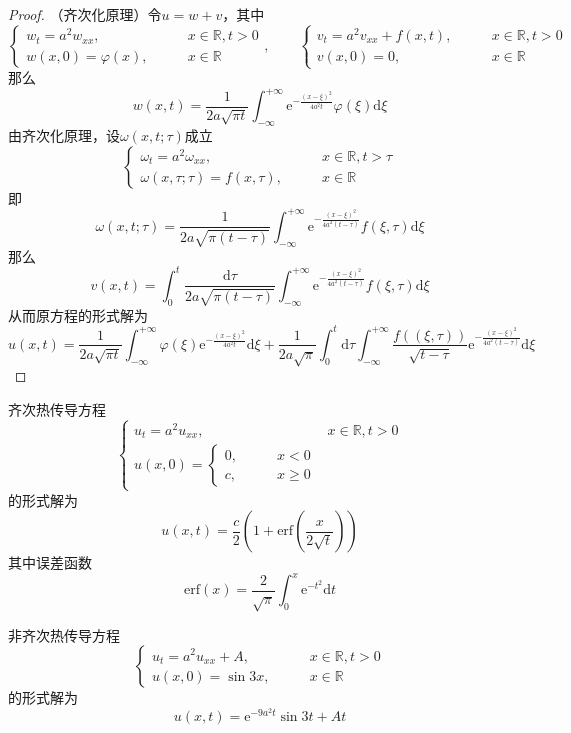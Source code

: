 \documentclass[lang = cn, scheme = chinese, thmcnt = section]{elegantbook}
\newcommand{\R}{\mathbb{R}}            %
\newcommand{\dd}{\mathrm{d}}           %
\newcommand{\ee}[1]{\mathrm{e}^{#1}}   %
\begin{document}
\begin{proof}
	（齐次化原理）令$u=w+v$，其中
	$$
	\begin{cases}
		w_t=a^2w_{xx},\qquad & x\in\R,t>0\\
		w(x,0)=\varphi(x),\qquad & x\in\R
	\end{cases},\qquad 
	\begin{cases}
		v_t=a^2v_{xx}+f(x,t),\qquad & x\in\R,t>0\\
		v(x,0)=0,\qquad & x\in\R
	\end{cases}
	$$
	那么
	$$
	w(x,t)
	=\frac{1}{2a\sqrt{\pi t}}\int_{-\infty}^{+\infty}\ee{-\frac{(x-\xi)^2}{4a^2t}}\varphi(\xi)\dd\xi
	$$
	由齐次化原理，设$\omega(x,t;\tau)$成立%
	$$
	\begin{cases}
		\omega_t=a^2\omega_{xx},\qquad & x\in\R,t>\tau\\
		\omega(x,\tau;\tau)=f(x,\tau),\qquad & x\in\R
	\end{cases}
	$$
	即%
	$$
	\omega(x,t;\tau)=\frac{1}{2a\sqrt{\pi (t-\tau)}}\int_{-\infty}^{+\infty}\ee{-\frac{(x-\xi)^2}{4a^2(t-\tau)}}f(\xi,\tau)\dd \xi
	$$
	那么%
	$$
	v(x,t)=\int_{0}^{t}\frac{\dd\tau}{2a\sqrt{\pi (t-\tau)}}\int_{-\infty}^{+\infty}\ee{-\frac{(x-\xi)^2}{4a^2(t-\tau)}}f(\xi,\tau)\dd \xi
	$$
	从而原方程的形式解为%
	$$
	u(x,t)=\frac{1}{2a\sqrt{\pi t}}\int_{-\infty}^{+\infty}\varphi(\xi)\ee{-\frac{(x-\xi)^2}{4a^2t}}\dd\xi
	+\frac{1}{2a\sqrt{\pi}}\int_{0}^{t}\dd\tau\int_{-\infty}^{+\infty}\frac{f((\xi,\tau))}{\sqrt{t-\tau}}\ee{-\frac{(x-\xi)^2}{4a^2(t-\tau)}}\dd\xi
	$$
\end{proof}

\begin{example}
	齐次热传导方程
	$$
	\begin{cases}
		u_t=a^2u_{xx},\qquad & x\in\R,t>0\\
		u(x,0)=\begin{cases}
			0,\qquad & x<0\\
			c,\qquad & x\ge 0
		\end{cases}
	\end{cases}
	$$
	的形式解为
	$$
	u(x,t)
	=\frac{c}{2}\left(1+\text{erf}\left(\frac{x}{2\sqrt{t}}\right)\right)
	$$
	其中误差函数%
	$$
	\text{erf}(x)=\frac{2}{\sqrt{\pi}}\int_{0}^{x}\ee{-t^2}\dd t
	$$
\end{example}

\begin{example}
	非齐次热传导方程
	$$
	\begin{cases}
		u_t=a^2u_{xx}+A,\qquad & x\in\R,t>0\\
		u(x,0)=\sin 3x,\qquad & x\in\R
	\end{cases}
	$$
	的形式解为
	$$
	u(x,t)=\ee{-9a^2t}\sin 3t+At
	$$
\end{example}
\end{document}
